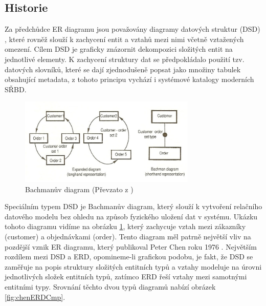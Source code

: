 \documentclass[czech,bachelor,public,dept460,male,oneside]{diploma}
\begin{document}
	\subsection{Historie}
	Za předchůdce ER diagramu jsou považovány diagramy datových struktur (DSD) \cite{bachmanDsd}, které rovněž slouží k zachycení entit a vztahů mezi nimi včetně vztažených omezení. Cílem DSD je graficky znázornit dekompozici složitých entit na jednotlivé elementy. K zachycení struktury dat se předpokládalo použití tzv. datových slovníků, které se dají zjednodušeně popsat jako množiny tabulek obsahující metadata, z tohoto principu vychází i systémové katalogy moderních SŘBD.
	
	\begin{figure}[!h]
		\centering
		\includegraphics[width=0.75\textwidth]{Figures/BachmanDiagram}
		\caption[Bachmanův diagram]{Bachmanův diagram (Převzato z \cite{wikiDsd})}
		\label{fig:bachmanDiag}
	\end{figure}
	
	Speciálním typem DSD je Bachmanův diagram, který slouží k vytvoření relačního datového modelu bez ohledu na způsob fyzického uložení dat v systému. Ukázku tohoto diagramu vidíme na obrázku \ref{fig:bachmanDiag}, který zachycuje vztah mezi zákazníky (customer) a objednávkami (order). Tento diagram měl patrně největší vliv na pozdější vznik ER diagramu, který publikoval Peter Chen roku 1976 \cite{chenERD}.
	Největším rozdílem mezi DSD a ERD, opomineme-li grafickou podobu, je fakt, že DSD se zaměřuje na popis struktury složitých entitních typů a vztahy modeluje na úrovni jednotlivých složek entitních typů, zatímco ERD řeší vztahy mezi samotnými entitními typy. Srovnání těchto dvou typů diagramů nabízí obrázek \ref{fig:chenERDCmp}.
	
\end{document}
